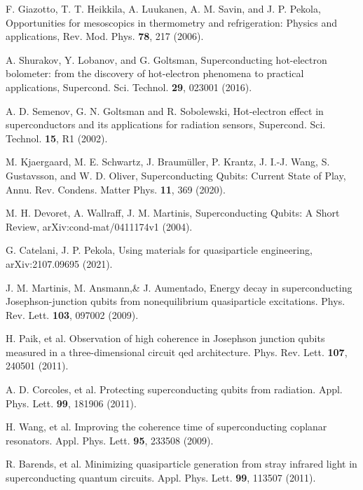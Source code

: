 \documentclass[prx,twocolumn,aps,superscriptaddress,showpacs,amsmath,amssymb,footnoteinbib]{revtex4-1}
\begin{document}
\begin{thebibliography}{99}

F. Giazotto, T. T. Heikkila, A. Luukanen, A. M. Savin, and J. P.
Pekola, Opportunities for mesoscopics in thermometry and
refrigeration: Physics and applications, Rev. Mod. Phys.
\textbf{78}, 217 (2006).

A. Shurakov, Y. Lobanov, and G. Goltsman, Superconducting
hot-electron bolometer: from the discovery of hot-electron
phenomena to practical applications,  Supercond. Sci. Technol.
\textbf{29}, 023001 (2016).

A. D. Semenov, G. N. Goltsman and R. Sobolewski, Hot-electron
effect in superconductors and its applications for radiation
sensors,  Supercond. Sci. Technol. \textbf{15}, R1 (2002).

M. Kjaergaard, M. E. Schwartz, J. Braum{\"u}ller, P. Krantz, J.
I.-J. Wang, S. Gustavsson, and W. D. Oliver, Superconducting Qubits:
Current State of Play, Annu. Rev. Condens. Matter Phys.
\textbf{11}, 369 (2020).

M. H. Devoret, A. Wallraff, J. M. Martinis, Superconducting
Qubits: A Short Review, arXiv:cond-mat/0411174v1 (2004).

G. Catelani, J. P. Pekola,
Using materials for quasiparticle engineering,
arXiv:2107.09695 (2021).

J. M. Martinis, M. Ansmann,\& J. Aumentado, Energy decay in
superconducting Josephson-junction qubits from nonequilibrium
quasiparticle excitations. Phys. Rev. Lett. \textbf{103}, 097002
(2009).

H. Paik, et al. Observation of high coherence in Josephson
junction qubits measured in a three-dimensional circuit qed
architecture. Phys. Rev. Lett. \textbf{107}, 240501 (2011).

A. D. Corcoles, et al. Protecting superconducting qubits from
radiation. Appl. Phys. Lett. \textbf{99}, 181906 (2011).

H. Wang, et al. Improving the coherence time of superconducting
coplanar resonators. Appl. Phys. Lett. \textbf{95}, 233508 (2009).

R. Barends, et al. Minimizing quasiparticle generation from stray
infrared light in superconducting quantum circuits. Appl. Phys.
Lett. \textbf{99}, 113507 (2011).


\end{thebibliography}
\end{document}
